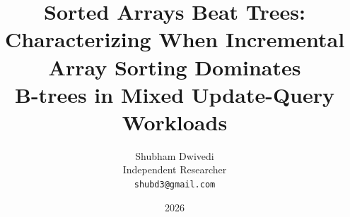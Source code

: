 \documentclass[11pt]{article}
\title{%
  Sorted Arrays Beat Trees:\\
  Characterizing When Incremental Array Sorting Dominates\\
  B-trees in Mixed Update-Query Workloads
}
\author{Shubham Dwivedi \\
  \small Independent Researcher \\
  \small \texttt{shubd3@gmail.com}
}
\date{2026}
\theoremstyle{definition}
\begin{document}
\maketitle

\begin{abstract}

\end{abstract}












\end{document}
